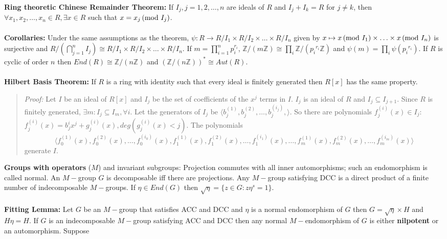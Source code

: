 {\bf Ring theoretic Chinese Remainder Theorem:} 
If $I_j, j= 1,2, \ldots, n$ are ideals of $R$ and
$I_j + I_k = R$ for $j \ne k$, then $\forall x_1 , x_2, \ldots , x_n \in R, \exists
x \in R$ such that $x= x_j \thinspace \textnormal{(mod } I_j \textnormal{)}$.
\\
\\
{\bf Corollaries:} Under the same assumptions as the theorem,
$\psi: R \rightarrow R/I_1 \times R/I_2 \times \ldots \times R/I_n$ given by
$x \mapsto x \thinspace \textnormal{(mod } I_1 \textnormal{)} \times \ldots \times x \thinspace \textnormal{(mod } I_n \textnormal{)}$ is surjective and
$R/(\bigcap_{j=1}^n I_j) \cong R/I_1 \times R/I_2 \times \ldots \times R/I_n$.
If $m= \prod_{i=1}^n p_i^{r_i}$,
${\mathbb Z}/(m{\mathbb Z}) \cong \prod_i {\mathbb Z}/({p_i}^{r_i}{\mathbb Z})$ and
$\psi(m)= \prod_i \psi({p_i}^{r_i})$.  If $R$ is cyclic of order $n$ then
$End(R) \cong {\mathbb Z}/(n{\mathbb Z})$ and
$({\mathbb Z}/(n{\mathbb Z}))^* \cong Aut(R)$.
\\
\\
{\bf Hilbert Basis Theorem: }
If $R$ is a ring with identity such that every ideal is finitely 
generated then $R[x]$ has the same property.
\begin{quote}
\emph{Proof:}
Let $I$ be an ideal of $R[x]$ and $I_j$ be the set of coefficients
of the $x^j$ terms in $I$.  $I_j$ is an ideal of $R$ and $I_j \subseteq I_{j+1}$.
Since $R$ is finitely generated, $\exists m: I_j \subseteq I_m, \forall i$.
Let the generators of $I_j$ be 
$\langle b^{(1)}_j, b^{(2)}_j,  \ldots , b^{(i_j)}_j, \rangle$.  So there are
polynomials $f_j^{(i)}(x) \in I_j$:
$f_j^{(i)}(x)= b_j^{i} x^j + g_j^{(i)}(x), deg (g_j^{(i)}(x)< j)$.
The polynomials
$$\langle
f_0^{(1)}(x),
f_0^{(2)}(x), \ldots,
f_0^{(i_0)}(x), 
f_1^{(1)}(x),
f_1^{(2)}(x), \ldots,
f_1^{(i_1)}(x), 
\ldots,
f_m^{(1)}(x),
f_m^{(2)}(x), \ldots,
f_m^{(i_m)}(x)
\rangle$$
generate $I$.
\end{quote}
{\bf Groups with operators} ($M$) and invariant subgroups:  Projection commutes with
all inner automorphisms; such an endomorphism is called normal.  An $M-$group
$G$ is decomposable 
iff there are projections.  Any $M-$group satisfying DCC is a direct
product of a finite number of indecomposable $M-$groups.  If $\eta \in  End(G)$
then ${\sqrt \eta}= \{z \in G: z \eta^s=1 \}$.
\\
\\
{\bf Fitting Lemma:}  Let $G$ be an $M-$group that satisfies ACC and DCC and $\eta$ is a
normal endomorphism of $G$ then $G= {\sqrt \eta} \times H$ and $H \eta = H$.
If $G$ is an indecomposable $M-$group satisfying ACC and DCC then any normal
$M-$endomorphism of $G$ is either {\bf nilpotent} or an automorphism.  Suppose
